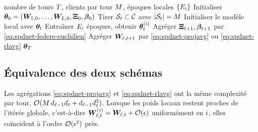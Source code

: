 \begin{algorithm}[htb]
  \caption{}
  \label{algo:spdnet-fedspdnet}
  \begin{algorithmic}[1]
    \Require nombre de tours $T$, clients par tour $M$, époques locales $\{E_i\}$
    \State Initialiser $\boldsymbol{\theta}_0=(\boldsymbol{W}_{1,0},\dots,\boldsymbol{W}_{L,0},\boldsymbol{\Xi}_0,\boldsymbol{\beta}_0)$
      \State Tirer $\mathcal{S}_t\subset\mathcal{C}$ avec $|\mathcal{S}_t|=M$
        \State Initialiser le modèle local avec $\boldsymbol{\theta}_t$
        \State Entraîner $E_i$ époques, obtenir $\boldsymbol{\theta}_t^{(i)}$
      \EndFor
      \State Agréger $\boldsymbol{\Xi}_{t+1},\boldsymbol{\beta}_{t+1}$ par \cref{eq:spdnet-federe-euclidien}
        \State Agréger $\boldsymbol{W}_{\ell,t+1}$ par \cref{eq:spdnet-projavg} ou \cref{eq:spdnet-rlavg}
      \EndFor
    \EndFor
    \Ensure $\boldsymbol{\theta}_{T}$
  \end{algorithmic}
\end{algorithm}

\subsection{Équivalence des deux schémas}
\label{sec:spdnet-federe-equivalence}

\begin{proposition}
\label{prop:spdnet-federe-equivalence}
  Les agrégations \cref{eq:spdnet-projavg} et \cref{eq:spdnet-rlavg} ont la même
  complexité par tour,
  $\mathcal{O}(M\,d_{\ell-1}d_{\ell}+d_{\ell-1}d_{\ell}^2)$.
  Lorsque les poids locaux restent proches de l'itérée globale, c'est-à-dire
  $\boldsymbol{W}^{(i)}_{\ell,t}=\boldsymbol{W}_{\ell,t}+\mathcal{O}(\epsilon)$
  uniformément en $i$, elles coïncident à l'ordre $\mathcal{O}(\epsilon^2)$ près.
\end{proposition}


